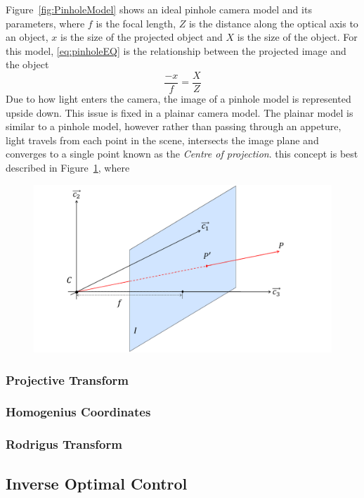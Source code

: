 \documentclass{UoNMCHA}
\numberwithin{equation}{section}
\begin{document}
Figure~\ref{fig:PinholeModel} shows an ideal pinhole camera model and its parameters, where $f$ is the focal length, $Z$ is the distance along the optical axis to an object, $x$ is the size of the projected object and $X$ is the size of the object. For this model, \eqref{eq:pinholeEQ} is the relationship between the projected image and the object
\begin{equation}\label{eq:pinholeEQ}
	\frac{-x}{f} = \frac{X}{Z}
\end{equation}
Due to how light enters the camera, the image of a pinhole model is represented upside down. This issue is fixed in a plainar camera model. The plainar model is similar to a pinhole model, however rather than passing through an appeture, light travels from each point in the scene, intersects the image plane and converges to a single point known as the \textit{Centre of projection}. this concept is best described in Figure~\ref{fig:PlainarModel}, where

\begin{figure}[ht]
    \begin{center}
        \includegraphics[width=.6\linewidth]{Figures/Planar_Model}
        \caption{}
        \label{fig:PlainarModel}
    \end{center}
\end{figure}

\subsubsection{Projective Transform}
\subsubsection{Homogenius Coordinates}
\subsubsection{Rodrigus Transform}

\subsection{Inverse Optimal Control} %
\end{document}
